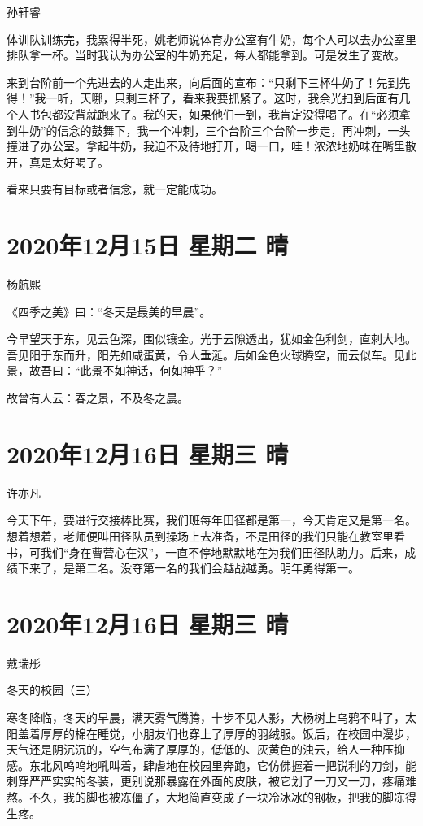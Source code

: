 孙轩睿

体训队训练完，我累得半死，姚老师说体育办公室有牛奶，每个人可以去办公室里排队拿一杯。当时我认为办公室的牛奶充足，每人都能拿到。可是发生了变故。

来到台阶前一个先进去的人走出来，向后面的宣布：“只剩下三杯牛奶了！先到先得！”我一听，天哪，只剩三杯了，看来我要抓紧了。这时，我余光扫到后面有几个人书包都没背就跑来了。我的天，如果他们一到，我肯定没得喝了。在“必须拿到牛奶”的信念的鼓舞下，我一个冲刺，三个台阶三个台阶一步走，再冲刺，一头撞进了办公室。拿起牛奶，我迫不及待地打开，喝一口，哇！浓浓地奶味在嘴里散开，真是太好喝了。

看来只要有目标或者信念，就一定能成功。

\section{2020年12月15日 星期二 晴}

杨航熙

《四季之美》曰：“冬天是最美的早晨”。

今早望天于东，见云色深，围似镶金。光于云隙透出，犹如金色利剑，直刺大地。吾见阳于东而升，阳先如咸蛋黄，令人垂涎。后如金色火球腾空，而云似车。见此景，故吾曰：“此景不如神话，何如神乎？”

故曾有人云：春之景，不及冬之晨。

\section{2020年12月16日 星期三 晴}

许亦凡

今天下午，要进行交接棒比赛，我们班每年田径都是第一，今天肯定又是第一名。想着想着，老师便叫田径队员到操场上去准备，不是田径的我们只能在教室里看书，可我们“身在曹营心在汉”，一直不停地默默地在为我们田径队助力。后来，成绩下来了，是第二名。没夺第一名的我们会越战越勇。明年勇得第一。

\section{2020年12月16日 星期三 晴}

戴瑞彤

冬天的校园（三）

寒冬降临，冬天的早晨，满天雾气腾腾，十步不见人影，大杨树上乌鸦不叫了，太阳盖着厚厚的棉在睡觉，小朋友们也穿上了厚厚的羽绒服。饭后，在校园中漫步，天气还是阴沉沉的，空气布满了厚厚的，低低的、灰黄色的浊云，给人一种压抑感。东北风呜呜地吼叫着，肆虐地在校园里奔跑，它仿佛握着一把锐利的刀剑，能刺穿严严实实的冬装，更别说那暴露在外面的皮肤，被它划了一刀又一刀，疼痛难熬。不久，我的脚也被冻僵了，大地简直变成了一块冷冰冰的钢板，把我的脚冻得生疼。

